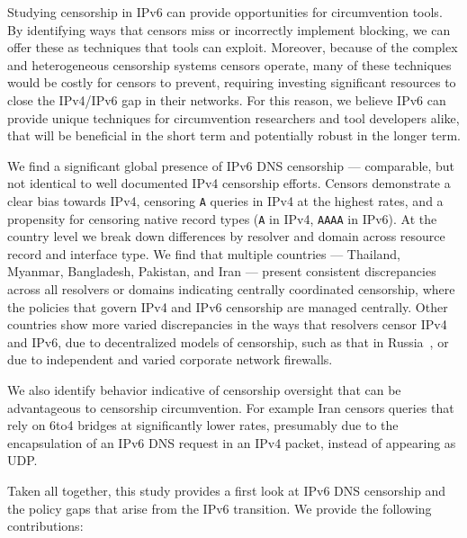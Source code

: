 Studying censorship in IPv6 can provide opportunities for circumvention tools.
By identifying ways that censors miss or incorrectly implement blocking, we can
offer these as techniques that tools can exploit. Moreover, because of the
complex and heterogeneous censorship systems censors operate, many of these
techniques would be costly for censors to prevent, requiring investing
significant resources to close the IPv4/IPv6 gap in their networks. For this
reason, we believe IPv6 can provide unique techniques for circumvention
researchers and tool developers alike, that will be beneficial in the short term and
potentially robust in the longer term.

\medskip
We find a significant global presence of IPv6 DNS censorship --- comparable, but not
identical to well documented IPv4 censorship efforts. Censors demonstrate a
clear bias towards IPv4, censoring \texttt{A} queries in IPv4 at the highest rates,
and a propensity for censoring native record types (\texttt{A} in IPv4, \texttt{AAAA} in IPv6).
At the country level we break down differences by resolver and
domain across resource record and interface type. We find that multiple countries
--- Thailand, Myanmar, Bangladesh, Pakistan, and Iran ---
present consistent discrepancies across all resolvers or domains indicating
centrally coordinated censorship, where the policies that govern IPv4 and IPv6
censorship are managed centrally.
Other countries show more varied discrepancies in the
ways that resolvers censor IPv4 and IPv6, due to decentralized models of
censorship, such as that in Russia~\cite{ramesh2020decentralized}, or due to
independent and varied corporate network firewalls.

We also identify behavior indicative of censorship oversight that can be advantageous
to censorship circumvention. For example Iran censors queries that rely on 6to4
bridges at significantly lower rates, presumably due to the encapsulation of an
IPv6 DNS request in an IPv4 packet, instead of appearing as UDP.


Taken all together, this study provides a first look at IPv6 DNS censorship and
the policy gaps that arise from the IPv6 transition. We provide the following
contributions:

